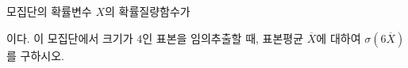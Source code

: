 모집단의 확률변수 $X$의 확률질량함수가 \par\smallskip{}\par\smallskip\noindent 이다. 이 모집단에서 크기가 $4$인 표본을 임의추출할 때, 표본평균 $\overline{X}$에 대하여 $\sigma(6\overline{X})$를 구하시오.
